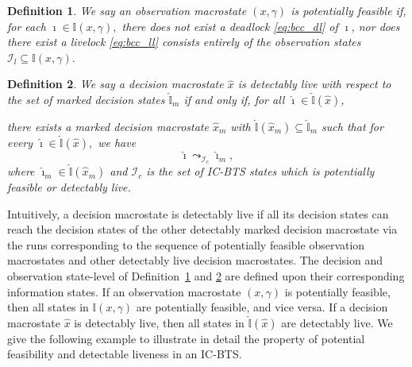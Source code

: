 \documentclass[twocolumn]{autart}
\newtheorem{mydef}{\bf Definition}
\begin{document}
%
\begin{mydef}\label{def:z_pf}
    We say an observation macrostate $(x,\gamma)$ is potentially feasible if, for each
    $
    \imath \in \mathbb{I}(x, \gamma),
    $
    there does not exist a deadlock \eqref{eq:bcc_dl} of $\imath$, nor does there exist a livelock \eqref{eq:bcc_ll} consists entirely of the observation states
    $
    \mathcal{I}_l \subseteq \mathbb{I}(x,\gamma).
    $
\end{mydef}
%
\begin{mydef}\label{def:y_cl}
    We say a decision macrostate $\hat{x}$ is \emph{detectably live} with respect to the set of marked decision states $\hat{\mathbb{I}}_m$ if and only if, for all $\hat{\imath}\in \hat{\mathbb{I}}(\hat{x})$, 
    
    there exists a marked decision macrostate $\hat{x}_m$ with
$
\hat{\mathbb{I}}(\hat{x}_m) \subseteq \hat{\mathbb{I}}_m
$
such that for every 
$
\hat{\imath} \in \hat{\mathbb{I}}(\hat{x}),
$
we have
$$
    \hat{\imath} \leadsto_{\mathcal{I}_c} \hat{\imath}_m,
$$
where $\hat{\imath}_m \in \hat{\mathbb{I}}(\hat{x}_m)$ and $\mathcal{I}_c$ is the set of IC-BTS states which is potentially feasible or detectably live.
\end{mydef}
%
Intuitively, a decision macrostate is detectably live if all its decision states can reach the decision states of the other detectably marked decision macrostate via the runs corresponding to the sequence of potentially feasible observation macrostates and other detectably live decision macrostates.
%
The decision and observation state-level of Definition~\ref{def:z_pf} and \ref{def:y_cl} are defined upon their corresponding information states.
If an observation macrostate $(x, \gamma)$ is potentially feasible, then all states in 
$\mathbb{I}(x, \gamma)$ are potentially feasible, and vice versa.
If a decision macrostate $\hat{x}$ is detectably live, then all states in 
$\hat{\mathbb{I}}(\hat{x})$ are detectably live.
%
%
We give the following example to illustrate in detail the property of potential feasibility and detectable liveness in an IC-BTS.
\end{document}

